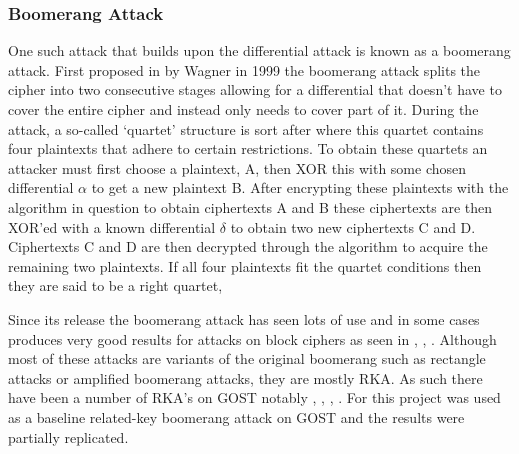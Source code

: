 \documentclass[10pt,journal,compsoc]{IEEEtran}
\begin{document}
\subsubsection{Boomerang Attack}
One such attack that builds upon the differential attack is known as a boomerang attack. First proposed in \cite{10.1007/3-540-48519-8_12} by Wagner in 1999 the boomerang attack splits the cipher into two consecutive stages allowing for a differential that doesn’t have to cover the entire cipher and instead only needs to cover part of it. During the attack, a so-called ‘quartet’ structure is sort after where this quartet contains four plaintexts that adhere to certain restrictions. To obtain these quartets an attacker must first choose a plaintext, A, then XOR this with some chosen differential \(\alpha\) to get a new plaintext B. After encrypting these plaintexts with the algorithm in question to obtain ciphertexts A and B these ciphertexts are then XOR'ed with a known differential \(\delta\) to obtain two new ciphertexts C and D. Ciphertexts C and D are then decrypted through the algorithm to acquire the remaining two plaintexts. If all four plaintexts fit the quartet conditions then they are said to be a right quartet,

Since its release the boomerang attack has seen lots of use and in some cases produces very good results for attacks on block ciphers as seen in \cite{inproceedings2}, \cite{AC:BirKho09}, \cite{C:DunKelWei23}. Although most of these attacks are variants of the original boomerang such as rectangle attacks or amplified boomerang attacks, they are mostly RKA. As such there have been a number of RKA's on GOST notably \cite{inproceedings2}, \cite{fse-2004-3110}, \cite{cryptoeprint:2010/111}, \cite{articleruss}. For this project \cite{cryptoeprint:2010/111} was used as a baseline related-key boomerang attack on GOST and the results were partially replicated.
\end{document}
